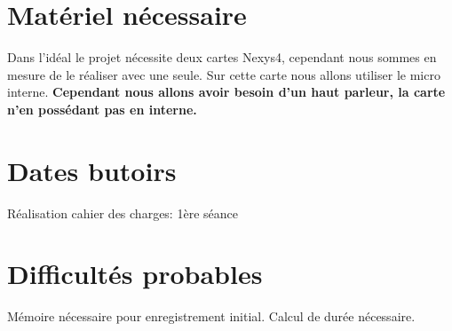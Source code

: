 \documentclass[paper=a4, fontsize=12pt]{article}
\numberwithin{equation}{section}		%
\numberwithin{figure}{section}			%
\numberwithin{table}{section}				%
\begin{document}
\section{Matériel nécessaire}

Dans l'idéal le projet nécessite deux cartes Nexys4, cependant nous sommes en mesure de le réaliser avec une seule. Sur cette carte nous allons utiliser le micro interne.
\textbf{Cependant nous allons avoir besoin d'un haut parleur, la carte n'en possédant pas en interne.}

\section{Dates butoirs}
Réalisation cahier des charges: 1ère séance

\section{Difficultés probables}
Mémoire nécessaire pour enregistrement initial. Calcul de durée nécessaire.

\end{document}
